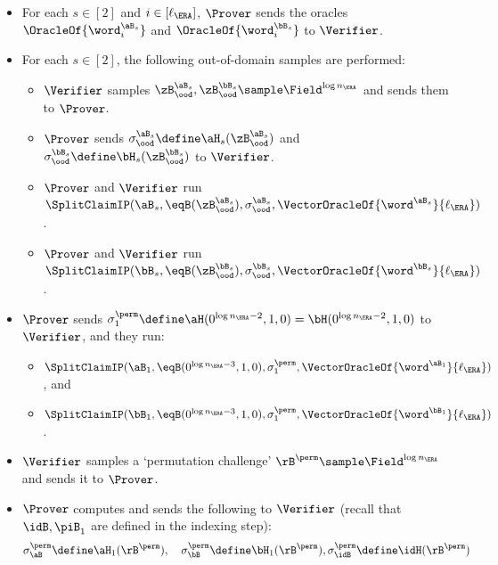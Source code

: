 \begin{tcolorbox}[breakable, enhanced, colback=white, boxrule=0.65pt]
\begin{enumerate}[nolistsep]
\begin{itemize}[nolistsep]
            \item For each $s \in [2]$ and $i \in [\ell_{\ERA}]$, $\Prover$ sends the oracles $\OracleOf{\word^{\aB_{s}}_i}$ and $\OracleOf{\word^{\bB_{s}}_i}$ to $\Verifier$.
            \item For each $s \in [2]$, the following out-of-domain samples are performed:
            \begin{itemize}[nolistsep]
            \item $\Verifier$ samples $\zB^{\aB_{s}}_{\ood}, \zB^{\bB_{s}}_{\ood} \sample \Field^{\log n_{\ERA}}$ and sends them to $\Prover$.
            \item $\Prover$ sends $\sigma^{\aB_{s}}_{\ood} \define \aH_s(\zB^{\aB_{s}}_{\ood})$ and $\sigma^{\bB_{s}}_{\ood} \define \bH_s(\zB^{\bB_{s}}_{\ood})$ to $\Verifier$.
            \item $\Prover$ and $\Verifier$ run $\SplitClaimIP(\aB_s, \eqB(\zB^{\aB_{s}}_{\ood}), \sigma^{\aB_{s}}_{\ood}, \VectorOracleOf{\word^{\aB_{s}}}{\ell_{\ERA}})$.
            \item $\Prover$ and $\Verifier$ run $\SplitClaimIP(\bB_s, \eqB(\zB^{\bB_{s}}_{\ood}), \sigma^{\bB_{s}}_{\ood}, \VectorOracleOf{\word^{\bB_{s}}}{\ell_{\ERA}})$.
        \end{itemize}
        \item $\Prover$ sends $\sigma^{\perm}_{1} \define \aH(0^{\log n_{\ERA} - 2}, 1 , 0) = \bH(0^{\log n_{\ERA} - 2}, 1 , 0)$ to $\Verifier$, and they run:
        \begin{itemize}[nolistsep]
            \item $\SplitClaimIP(\aB_1, \eqB(0^{\log n_{\ERA} - 3} , 1 , 0), \sigma^{\perm}_1, \VectorOracleOf{\word^{\aB_{1}}}{\ell_{\ERA}})$, and
            \item $\SplitClaimIP(\bB_1, \eqB(0^{\log n_{\ERA} - 3} , 1 , 0), \sigma^{\perm}_1, \VectorOracleOf{\word^{\bB_{1}}}{\ell_{\ERA}})$.
        \end{itemize}
        \item $\Verifier$ samples a `permutation challenge' $\rB^{\perm} \sample \Field^{\log n_{\ERA}}$ and sends it to $\Prover$.
        \item $\Prover$ computes and sends the following to $\Verifier$ (recall that $\idB, \piB_1$ are defined in the indexing step):
        \begin{align*}
            \sigma^{\perm}_{\aB} &\define \aH_1(\rB^{\perm}), \quad \sigma^{\perm}_{\bB} \define \bH_1(\rB^{\perm}), \sigma^{\perm}_{\idB} \define \idH(\rB^{\perm}) \\

\end{align*}
\end{itemize}
\end{enumerate}
\end{tcolorbox}
